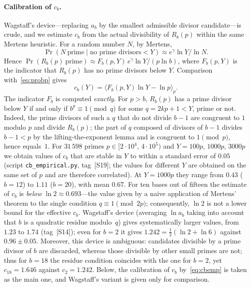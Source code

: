 \documentclass[11pt,a4paper]{article}
\theoremstyle{plain}
\theoremstyle{remark}
\newcommand{\Rb}{R_b}
\newcommand{\eg}{e^{\gamma}}
\begin{document}
\paragraph{Calibration of $c_b$.} Wagstaff's device---replacing $a_b$ by the
smallest admissible divisor candidate---is crude, and we estimate $c_b$ from the
actual divisibility of $\Rb(p)$ within the same Mertens heuristic. For a random
number $N$, by Mertens,
\[
\Pr(N\ \text{prime}\mid\text{no prime divisors}<Y)\approx\eg\ln Y/\ln N.
\]
Hence $\Pr(\Rb(p)\ \text{prime})\approx F_b(p,Y)\,\eg\ln Y/(p\ln b)$, where
$F_b(p,Y)$ is the indicator that $\Rb(p)$ has no prime divisors below $Y$.
Comparison with~\eqref{eq:probp} gives
\begin{equation}\label{eq:cbemp}
c_b(Y)=\bigl\langle F_b(p,Y)\ln Y-\ln p\bigr\rangle_p .
\end{equation}
The indicator $F_b$ is computed \emph{exactly}. For $p>b$, $\Rb(p)$ has a prime
divisor below $Y$ if and only if $b^p\equiv1\pmod q$ for some $q=2kp+1<Y$, prime
or not. Indeed, the prime divisors of such a $q$ that do not divide $b-1$ are
congruent to $1$ modulo $p$ and divide $\Rb(p)$; the part of $q$ composed of
divisors of $b-1$ divides $b-1<p$ by the lifting-the-exponent lemma and is
congruent to $1\pmod p$, hence equals~$1$. For $31\,598$ primes
$p\in[2\cdot10^4,\,4\cdot10^5)$ and $Y=100p$, $1000p$, $3000p$ we obtain values
of $c_b$ that are stable in $Y$ to within a standard error of $0.05$ (script
\texttt{cb\_empirical.py}, tag~[S19]; the values for different $Y$ are obtained
on the same set of $p$ and are therefore correlated). At $Y=1000p$ they range
from $0.43$ ($b=12$) to $1.11$ ($b=20$), with mean $0.67$. For ten bases out of
fifteen the estimate of $c_b$ is \emph{below} $\ln2\approx0.693$---the value
given by a naive application of Mertens' theorem to the single condition
$q\equiv1\pmod{2p}$; consequently, $\ln2$ is not a lower bound for the effective
$c_b$. Wagstaff's device (averaging $\ln a_b$ taking into account that $b$ is a
quadratic residue modulo~$q$) gives systematically larger values, from $1.23$ to
$1.74$ (tag~[S14]); even for $b=2$ it gives $1.242=\tfrac12(\ln2+\ln6)$ against
$0.96\pm0.05$. Moreover, this device is ambiguous: candidates divisible by a
prime divisor of $b$ are discarded, whereas those divisible by other small
primes are not; thus for $b=18$ the residue condition coincides with the one for
$b=2$, yet $c_{18}=1.646$ against $c_2=1.242$. Below, the calibration of
$c_b$ by~\eqref{eq:cbemp} is taken as the main one, and Wagstaff's variant is
given only for comparison.
\end{document}
